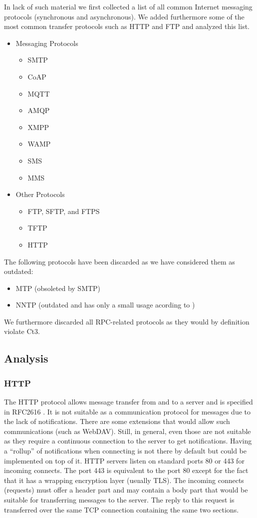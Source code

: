 In lack of such material we first collected a list of all common Internet messaging protocols (synchronous and asynchronous). We added furthermore some of the most common transfer protocols such as HTTP and FTP and analyzed this list.

\begin{itemize}
	\item Messaging Protocols
	\begin{itemize}
		\item SMTP
		\item CoAP
		\item MQTT
		\item AMQP
		\item XMPP
		\item WAMP
		\item SMS
		\item MMS
	\end{itemize}
	\item Other Protocols
	\begin{itemize}
		\item FTP, SFTP, and FTPS
		\item TFTP
		\item HTTP
	\end{itemize}
\end{itemize}

The following protocols have been discarded as we have considered them as outdated:
\begin{itemize}
	\item MTP\cite{rfc780} (obsoleted by SMTP)
	\item NNTP\cite{rfc3977} (outdated and has only a small usage acording to \cite{kim2010today})
\end{itemize}

We furthermore discarded all RPC-related protocols as they would by definition violate Ct3.

\subsection{Analysis}
\subsubsection{HTTP}
The HTTP protocol allows message transfer from and to a server and is specified in RFC2616 \cite{rfc2616}. It is not suitable as a communication protocol for messages due to the lack of notifications. There are some extensions that would allow such communications (such as WebDAV). Still, in general, even those are not suitable as they require a continuous connection to the server to get notifications. Having a ``rollup'' of notifications when connecting is not there by default but could be implemented on top of it. HTTP servers listen on standard ports 80 or 443 for incoming connects. The port 443 is equivalent to the port 80 except for the fact that it has a wrapping encryption layer (usually TLS). The incoming connects (requests) must offer a header part and may contain a body part that would be suitable for transferring messages to the server. The reply to this request is transferred over the same TCP connection containing the same two sections.

